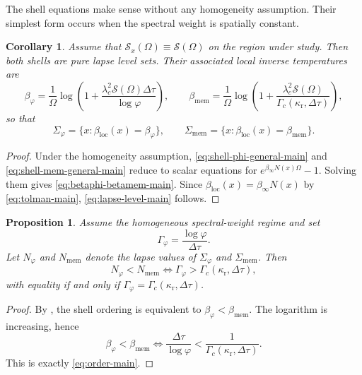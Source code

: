 \documentclass[11pt]{amsart}
\numberwithin{equation}{section}
\newtheorem{proposition}[theorem]{Proposition}
\newtheorem{corollary}[theorem]{Corollary}
\theoremstyle{remark}
\begin{document}
The shell equations make sense without any homogeneity assumption. Their simplest form occurs when the spectral weight is spatially constant.

\begin{corollary}\label{cor:homogeneous-main}
Assume that $\mathcal S_x(\Omega)\equiv\mathcal S(\Omega)$ on the region under study. Then both shells are pure lapse level sets. Their associated local inverse temperatures are
\begin{equation}\label{eq:betaphi-betamem-main}
\beta_{\varphi}=
\frac{1}{\Omega}
\log\!\left(1+\frac{\lambda_c^2\mathcal S(\Omega)\Delta\tau}{\log\varphi}\right),
\qquad
\beta_{\mathrm{mem}}=
\frac{1}{\Omega}
\log\!\left(1+\frac{\lambda_c^2\mathcal S(\Omega)}
{\Gamma_c(\kappa_{\mathrm r},\Delta\tau)}\right),
\end{equation}
so that
\begin{equation}\label{eq:lapse-level-main}
\Sigma_{\varphi}=\{x:\beta_{\mathrm{loc}}(x)=\beta_{\varphi}\},
\qquad
\Sigma_{\mathrm{mem}}=\{x:\beta_{\mathrm{loc}}(x)=\beta_{\mathrm{mem}}\}.
\end{equation}
\end{corollary}

\begin{proof}
Under the homogeneity assumption, \eqref{eq:shell-phi-general-main} and \eqref{eq:shell-mem-general-main} reduce to scalar equations for $e^{\beta_\infty N(x)\Omega}-1$. Solving them gives \eqref{eq:betaphi-betamem-main}. Since $\beta_{\mathrm{loc}}(x)=\beta_\infty N(x)$ by \eqref{eq:tolman-main}, \eqref{eq:lapse-level-main} follows.
\end{proof}

\begin{proposition}\label{prop:order-main}
Assume the homogeneous spectral-weight regime and set
\[
\Gamma_{\varphi}=\frac{\log\varphi}{\Delta\tau}.
\]
Let $N_{\varphi}$ and $N_{\mathrm{mem}}$ denote the lapse values of $\Sigma_{\varphi}$ and $\Sigma_{\mathrm{mem}}$. Then
\begin{equation}\label{eq:order-main}
N_{\varphi}<N_{\mathrm{mem}}
\iff
\Gamma_{\varphi}>\Gamma_c(\kappa_{\mathrm r},\Delta\tau),
\end{equation}
with equality if and only if $\Gamma_{\varphi}=\Gamma_c(\kappa_{\mathrm r},\Delta\tau)$.
\end{proposition}

\begin{proof}
By , the shell ordering is equivalent to $\beta_{\varphi}<\beta_{\mathrm{mem}}$. The logarithm is increasing, hence
\[
\beta_{\varphi}<\beta_{\mathrm{mem}}
\iff
\frac{\Delta\tau}{\log\varphi}
<
\frac{1}{\Gamma_c(\kappa_{\mathrm r},\Delta\tau)}.
\]
This is exactly \eqref{eq:order-main}.
\end{proof}
\end{document}
